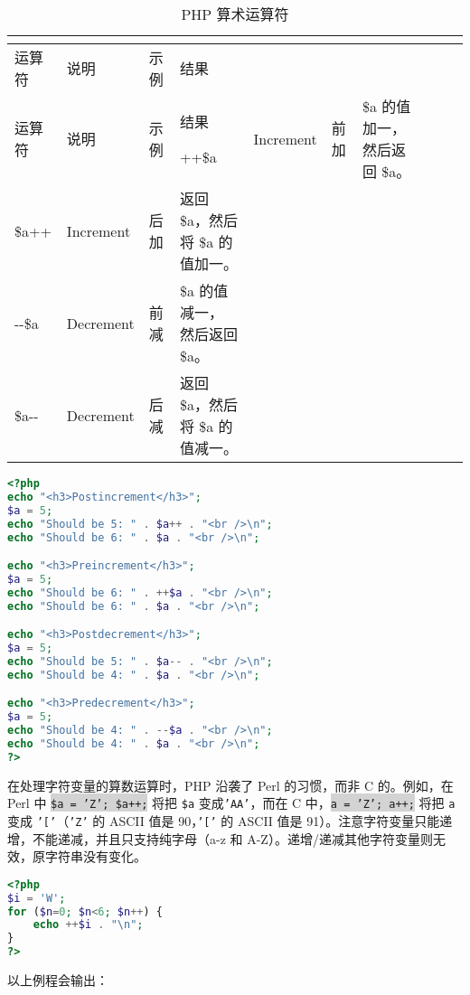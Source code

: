 \begin{longtable}{|m{35pt}|m{130pt}|m{50pt}|m{150pt}|}
\tabularnewline\hline
运算符	&说明	&示例	&结果
\endhead

\caption{PHP 算术运算符}\\
\hline
运算符	&说明	&示例	&结果
\endfirsthead

\endfoot

\endlastfoot
\hline
++\$a	&Increment		&  前加	&\$a 的值加一，然后返回 \$a。\\
\hline
\$a++	&Increment		&后加	& 返回 \$a，然后将 \$a 的值加一。\\
\hline
-\/-\$a	&Decrement	&前减	&\$a 的值减一， 然后返回 \$a。\\
\hline
\$a-\/- 	&Decrement	&后减	&返回 \$a，然后将 \$a 的值减一。\\
\hline
\end{longtable}


\begin{lstlisting}[language=PHP]
<?php
echo "<h3>Postincrement</h3>";
$a = 5;
echo "Should be 5: " . $a++ . "<br />\n";
echo "Should be 6: " . $a . "<br />\n";

echo "<h3>Preincrement</h3>";
$a = 5;
echo "Should be 6: " . ++$a . "<br />\n";
echo "Should be 6: " . $a . "<br />\n";

echo "<h3>Postdecrement</h3>";
$a = 5;
echo "Should be 5: " . $a-- . "<br />\n";
echo "Should be 4: " . $a . "<br />\n";

echo "<h3>Predecrement</h3>";
$a = 5;
echo "Should be 4: " . --$a . "<br />\n";
echo "Should be 4: " . $a . "<br />\n";
?>
\end{lstlisting}

在处理字符变量的算数运算时，PHP 沿袭了 Perl 的习惯，而非 C 的。例如，在 Perl 中 \colorbox{lightgray}{\texttt{\$a = 'Z'; \$a++;}} 将把 \texttt{\$a} 变成\texttt{'AA'}，而在 C 中，\colorbox{lightgray}{\texttt{a = 'Z'; a++;}} 将把 \texttt{a} 变成 \texttt{'['}（\texttt{'Z'} 的 ASCII 值是 90，\texttt{'['} 的 ASCII 值是 91）。注意字符变量只能递增，不能递减，并且只支持纯字母（a-z 和 A-Z）。递增/递减其他字符变量则无效，原字符串没有变化。

\begin{lstlisting}[language=PHP]
<?php
$i = 'W';
for ($n=0; $n<6; $n++) {
    echo ++$i . "\n";
}
?>
\end{lstlisting}

以上例程会输出：

